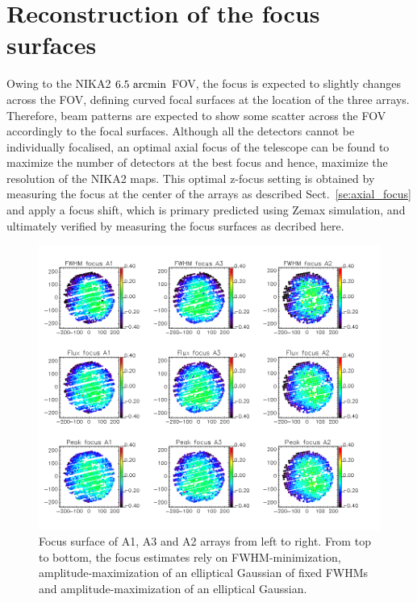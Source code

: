 

\section{Reconstruction of the focus surfaces}%
\label{sec:focus_surfaces}

Owing to the NIKA2 $6.5~\rm{arcmin}$ FOV, the focus is expected to
slightly changes across the FOV, defining curved focal surfaces at the
location of the three arrays. Therefore, beam patterns are expected to
show some scatter across the FOV accordingly to the focal
surfaces. Although all the detectors cannot be individually focalised,
an optimal axial focus of the telescope can be found to maximize the
number of detectors at the best focus and hence, maximize the
resolution of the NIKA2 maps.
This optimal z-focus setting is obtained by measuring the focus at the center of the arrays as described
Sect.~\ref{se:axial_focus} and apply a focus shift, which is primary
predicted using Zemax simulation, and ultimately verified by measuring
the focus surfaces as decribed here.

\begin{figure}
\begin{center}
  \includegraphics[trim={0, 1cm, 0, 1cm}, clip, angle=0, scale=0.5]{Figures/fov_focus_mv_5.png}
\caption[Focus surfaces]{Focus surface of A1, A3 and A2 arrays from left to
  right. From top to bottom, the focus estimates rely on
  FWHM-minimization, amplitude-maximization of an elliptical
  Gaussian of fixed FWHMs and amplitude-maximization of an elliptical
  Gaussian.  }
\label{fig:focus-surfaces}
\end{center}
\end{figure}

